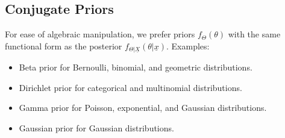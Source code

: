 \subsection{Conjugate Priors}
\begin{notes}
    For ease of algebraic manipulation, we prefer priors $f_\Theta (\theta)$ with the same functional form as the posterior $f_{\Theta | \underline{X}}(\theta | \underline{x})$. Examples:
    \begin{itemize}
        \item Beta prior for Bernoulli, binomial, and geometric distributions.
        \item Dirichlet prior for categorical and multinomial distributions.
        \item Gamma prior for Poisson, exponential, and Gaussian distributions.
        \item Gaussian prior for Gaussian distributions.
    \end{itemize}
\end{notes}